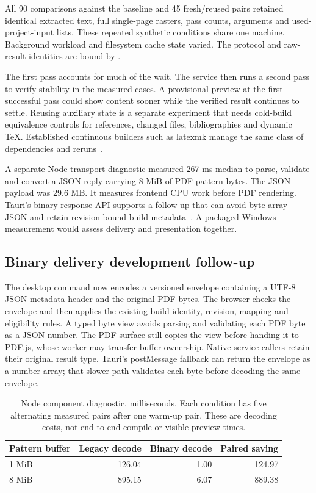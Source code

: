 All 90 comparisons against the baseline and 45 fresh/reused pairs retained
identical extracted text, full single-page rasters, pass counts, arguments
and used-project-input lists. These repeated synthetic conditions share
one machine. Background workload and filesystem cache state varied.
The protocol and raw-result identities are bound by
.

The first pass accounts for much of the wait. The service then runs a second
pass to verify stability in the measured cases. A provisional preview at the
first successful pass could show content sooner while the verified result
continues to settle. Reusing auxiliary state is a separate experiment
that needs cold-build equivalence controls for references, changed files,
bibliographies and dynamic TeX. Established continuous builders such as
latexmk manage the same class of dependencies and reruns~\cite{latexmkManual}.

A separate Node transport diagnostic measured 267 ms median to parse,
validate and convert a JSON reply carrying 8 MiB of PDF-pattern bytes.
The JSON payload was 29.6 MB. It measures frontend CPU work before PDF
rendering. Tauri's binary response API supports a follow-up that can
avoid byte-array JSON and retain revision-bound build
metadata~\cite{tauriBinaryIPC}. A packaged Windows measurement would assess
delivery and presentation together.

\subsection{Binary delivery development follow-up}

The desktop command now encodes a versioned envelope containing a UTF-8
JSON metadata header and the original PDF bytes. The browser checks the
envelope and then applies the existing build identity, revision, mapping
and eligibility rules. A typed byte view avoids parsing and validating
each PDF byte as a JSON number. The PDF surface still copies the view
before handing it to PDF.js, whose worker may transfer buffer ownership.
Native service callers retain their original result type. Tauri's
postMessage fallback can return the envelope as a number array; that
slower path validates each byte before decoding the same envelope.

\begin{table}[htbp]
\small\centering
\begin{tabular}{@{}lrrr@{}}
\toprule
Pattern buffer & Legacy decode & Binary decode & Paired saving\\
\midrule
1 MiB & 126.04 & 1.00 & 124.97\\
8 MiB & 895.15 & 6.07 & 889.38\\
\bottomrule
\end{tabular}
\caption{Node component diagnostic, milliseconds. Each condition has five
alternating measured pairs after one warm-up pair. These are decoding
costs, not end-to-end compile or visible-preview times.}
\label{tab:binary-compile-reply}
\end{table}

